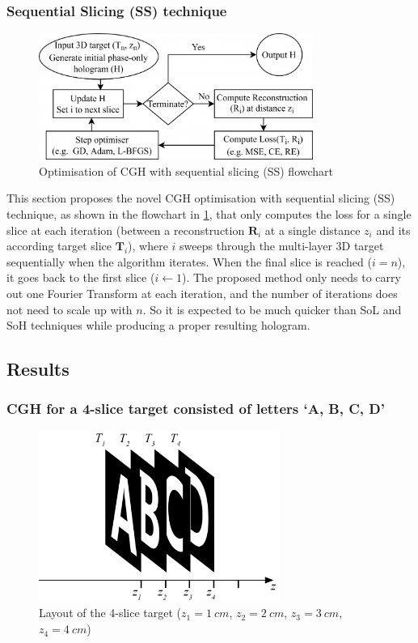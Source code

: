 \subsubsection{Sequential Slicing (SS) technique}
\begin{figure}[H]
	\centering
	\includegraphics[width=0.8\textwidth]{optim3d-cgh-flowchart}
	\caption{Optimisation of CGH with sequential slicing (SS) flowchart}
	\label{fig:optim3d-cgh-flowchart}
\end{figure}

This section proposes the novel CGH optimisation with sequential slicing (SS) technique, as shown in the flowchart in \cref{fig:optim3d-cgh-flowchart}, that only computes the loss for a single slice at each iteration (between a reconstruction $\textbf{R}_i$ at a single distance $z_i$ and its according target slice $\textbf{T}_i$), where $i$ sweeps through the multi-layer 3D target sequentially when the algorithm iterates. When the final slice is reached ($i=n$), it goes back to the first slice ($i \gets 1$). The proposed method only needs to carry out one Fourier Transform at each iteration, and the number of iterations does not need to scale up with $n$. So it is expected to be much quicker than SoL and SoH techniques while producing a proper resulting hologram.

\subsection{Results}
\subsubsection{CGH for a 4-slice target consisted of letters `A, B, C, D'}

\begin{figure}[H]
	\centering
	\includegraphics[width=0.7\textwidth]{Fresnel_slice_ABCD}
	\caption{Layout of the 4-slice target ($z_1=1\ cm$, $z_2=2\ cm$, $z_3=3\ cm$, $z_4=4\ cm$)}
	\label{fig:Fresnel_slice_ABCD}
\end{figure}

